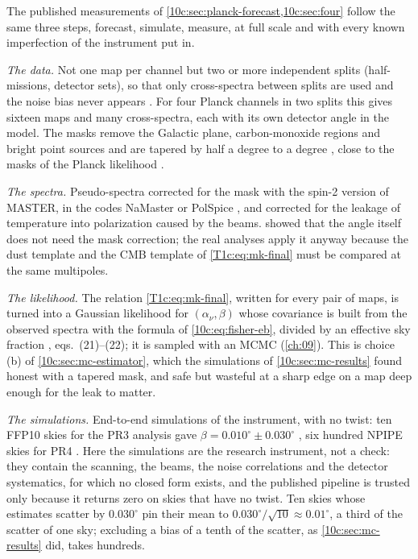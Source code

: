 The published measurements of \cref{10c:sec:planck-forecast,10c:sec:four} follow the same three steps,
forecast, simulate, measure, at full scale and with every known imperfection of the instrument put in.

\emph{The data.} Not one map per channel but two or more independent splits (half-missions, detector sets), so
that only cross-spectra between splits are used and the noise bias never appears \cite{MinamiKomatsu2020}. For four
Planck channels in two splits this gives sixteen maps and many cross-spectra, each with its own detector angle in
the model. The masks remove the Galactic plane, carbon-monoxide regions and bright point sources and are tapered by
half a degree to a degree \cite{MinamiKomatsu2020,DiegoPalazuelos2022}, close to the masks of the Planck likelihood
\cite{Planck2018V}.

\emph{The spectra.} Pseudo-spectra corrected for the mask with the spin-2 version of MASTER, in the codes NaMaster or
PolSpice \cite{Alonso2019}, and corrected for the leakage of temperature into polarization caused by the beams.
 showed that the angle itself does not need the mask correction; the real analyses apply it
anyway because the dust template and the CMB template of \cref{T1c:eq:mk-final} must be compared at the same
multipoles.

\emph{The likelihood.} The relation \cref{T1c:eq:mk-final}, written for every pair of maps, is turned into a Gaussian
likelihood for $(\alpha_\nu,\beta)$ whose covariance is built from the observed spectra with the formula of
\eqref{10c:eq:fisher-eb}, divided by an effective sky fraction \cite{EskiltKomatsu2022}, eqs.~(21)--(22); it is sampled with an
MCMC (\cref{ch:09}). This is choice (b) of \cref{10c:sec:mc-estimator}, which the simulations of \cref{10c:sec:mc-results} found honest with a tapered mask, and safe but wasteful at a sharp edge on a map deep enough for the leak to matter.

\emph{The simulations.} End-to-end simulations of the instrument, with no twist: ten FFP10 skies for the PR3 analysis
gave $\beta=0.010^\circ\pm0.030^\circ$ \cite{MinamiKomatsu2020}, six hundred NPIPE skies for PR4 \cite{DiegoPalazuelos2022}. Here
the simulations are the research instrument, not a check: they contain the scanning, the beams, the noise
correlations and the detector systematics, for which no closed form exists, and the published pipeline is trusted
only because it returns zero on skies that have no twist. Ten skies whose estimates scatter by $0.030^\circ$ pin their mean to
$0.030^\circ/\sqrt{10}\approx0.01^\circ$, a third of the scatter of one sky; excluding a bias of a tenth of the scatter, as
\cref{10c:sec:mc-results} did, takes hundreds.

